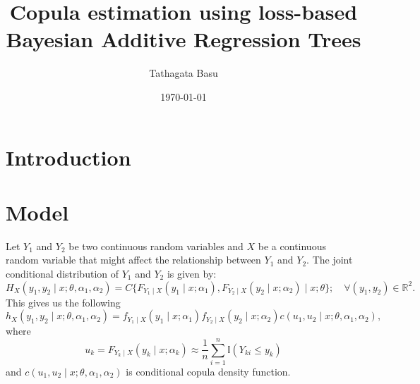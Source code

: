 \documentclass{amsart}
\title{Copula estimation using loss-based Bayesian Additive Regression Trees}
\author{Tathagata Basu}
\date{\today}
\begin{document}
\maketitle

\section{Introduction}

\section{Model}
Let $Y_1$ and $Y_2$ be two continuous random variables and $X$ be a continuous random variable 
that might affect the relationship between $Y_1$ and $Y_2$. The joint conditional distribution 
of $Y_1$ and $Y_2$ is given by:
\begin{equation}
    H_{X}(y_1,y_2\mid x; \theta, \alpha_1, \alpha_2) = C\{F_{Y_1\mid X}(y_1\mid x;\alpha_1),F_{Y_2\mid X}(y_2\mid x; \alpha_2)\mid x;\theta\}; \quad \forall (y_1,y_2) \in \mathbb{R}^2.
\end{equation}
This gives us the following
\begin{equation}
    h_{X}(y_1,y_2\mid x; \theta, \alpha_1, \alpha_2) = f_{Y_1\mid X}(y_1\mid x;\alpha_1)f_{Y_2\mid X}(y_2\mid x; \alpha_2)c(u_1,u_2\mid x;\theta, \alpha_1, \alpha_2),
\end{equation}
where
\begin{equation}\label{eq:emp_dist:Y}
    u_k = F_{Y_k\mid X}(y_k\mid x; \alpha_k)\approx \frac{1}{n}\sum_{i=1}^n \mathbb{I}(Y_{ki}\le y_k)
\end{equation}
and $c(u_1,u_2\mid x;\theta, \alpha_1, \alpha_2)$ is conditional copula density function.
\end{document}
